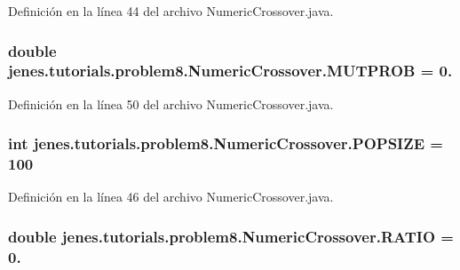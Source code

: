 Definición en la línea 44 del archivo Numeric\-Crossover.\-java.

\hypertarget{classjenes_1_1tutorials_1_1problem8_1_1_numeric_crossover_a4d0587e4b39b1f74efd20a0c921c38f7}{
\subsubsection[{M\-U\-T\-P\-R\-O\-B}]{\setlength{\rightskip}{0pt plus 5cm}double jenes.\-tutorials.\-problem8.\-Numeric\-Crossover.\-M\-U\-T\-P\-R\-O\-B = 0.\hspace{0.3cm}{\ttfamily [static]}}}\label{classjenes_1_1tutorials_1_1problem8_1_1_numeric_crossover_a4d0587e4b39b1f74efd20a0c921c38f7}


Definición en la línea 50 del archivo Numeric\-Crossover.\-java.

\hypertarget{classjenes_1_1tutorials_1_1problem8_1_1_numeric_crossover_a0a9b3b839ab6677dcbae723434df6551}{
\subsubsection[{P\-O\-P\-S\-I\-Z\-E}]{\setlength{\rightskip}{0pt plus 5cm}int jenes.\-tutorials.\-problem8.\-Numeric\-Crossover.\-P\-O\-P\-S\-I\-Z\-E = 100\hspace{0.3cm}{\ttfamily [static]}}}\label{classjenes_1_1tutorials_1_1problem8_1_1_numeric_crossover_a0a9b3b839ab6677dcbae723434df6551}


Definición en la línea 46 del archivo Numeric\-Crossover.\-java.

\hypertarget{classjenes_1_1tutorials_1_1problem8_1_1_numeric_crossover_ae3c1d4871321a6323d09add505679fe0}{
\subsubsection[{R\-A\-T\-I\-O}]{\setlength{\rightskip}{0pt plus 5cm}double jenes.\-tutorials.\-problem8.\-Numeric\-Crossover.\-R\-A\-T\-I\-O = 0.\hspace{0.3cm}{\ttfamily [static]}}}\label{classjenes_1_1tutorials_1_1problem8_1_1_numeric_crossover_ae3c1d4871321a6323d09add505679fe0}


